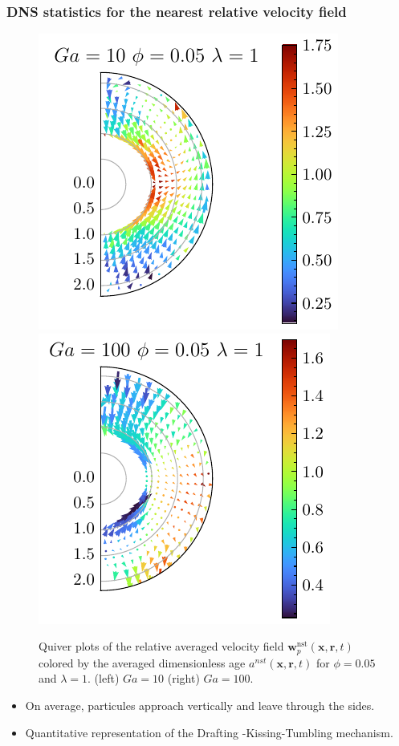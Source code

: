 \documentclass{sintefbeamer}
\begin{document}
\begin{frame}
  \frametitle{DNS statistics for the nearest relative velocity field}

  \begin{figure}[h!]
    \centering
    \includegraphics[height=0.35\textwidth]{image/HOMOGENEOUS_NEW/Dist/U_rel_l_1_Ga_10_PHI_5.pdf}
    \includegraphics[height=0.35\textwidth]{image/HOMOGENEOUS_NEW/Dist/U_rel_l_1_Ga_100_PHI_5.pdf}
    \caption{
      Quiver plots of the relative averaged velocity field $\textbf{w}^\text{nst}_p(\textbf{x},\textbf{r},t)$ colored by the averaged dimensionless age $a^{nst}(\textbf{x},\textbf{r},t)$ for $\phi = 0.05$ and $\lambda = 1$.
      \break
         (left) $Ga = 10$ (right) $Ga =100$. }
    \label{fig:Why_Ga_matter}
\end{figure}

\begin{itemize}
  \item On average, particules approach vertically and leave through the sides.
  \item Quantitative representation of the Drafting -Kissing-Tumbling mechanism.
\end{itemize}
\end{frame}
\end{document}
